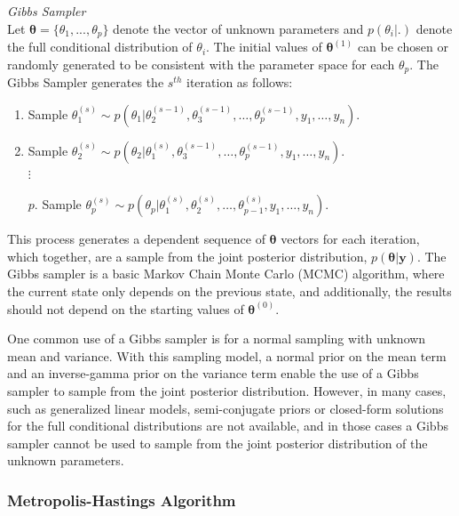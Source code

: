 \documentclass[12pt]{article}\usepackage[]{graphicx}\usepackage[]{color}
\begin{document}
\begin{mdframed}
\textit{Gibbs Sampler} \\
Let $\bm{\theta} = \{\theta_1, ..., \theta_p\}$ denote the vector of unknown parameters and $p(\theta_i|.)$ denote the full conditional distribution of $\theta_i$. The initial values of $\bm{\theta}^{(1)}$ can be chosen or randomly generated to be consistent with the parameter space for each $\theta_p$. The Gibbs Sampler generates the $s^{th}$ iteration as follows:
\begin{enumerate}
\item Sample $\theta_1^{(s)} \sim p(\theta_1|\theta_2^{(s-1)}, \theta_3^{(s-1)}, \dots, \theta_p^{(s-1)}, y_1, \dots, y_n)$. 
\item Sample $\theta_2^{(s)} \sim p(\theta_2|\theta_1^{(s)}, \theta_3^{(s-1)}, \dots, \theta_p^{(s-1)}, y_1, \dots, y_n)$.\\	
$\vdots$ \\[-14mm]
\item[$p$.] Sample $\theta_p^{(s)} \sim p(\theta_p|\theta_1^{(s)}, \theta_2^{(s)}, \dots, \theta_{p-1}^{(s)}, y_1, \dots , y_n)$. 
\end{enumerate}
\end{mdframed}

\noindent This process generates a dependent sequence of $\bm{\theta}$ vectors for each iteration, which together, are a sample from the joint posterior distribution, $p(\bm{\theta}|\bm{y})$. The Gibbs sampler is a basic Markov Chain Monte Carlo (MCMC) algorithm, where the current state only depends on the previous state, and additionally, the results should not depend on the starting values of $\bm{\theta}^{(0)}$.

One common use of a Gibbs sampler is for a normal sampling with unknown mean and variance. With this sampling model, a normal prior on the mean term and an inverse-gamma prior on the variance term enable the use of a Gibbs sampler to sample from the joint posterior distribution. However, in many cases, such as generalized linear models, semi-conjugate priors or closed-form solutions for the full conditional distributions are not available, and in those cases a Gibbs sampler cannot be used to sample from the joint posterior distribution of the unknown parameters. 

\subsubsection{Metropolis-Hastings Algorithm}
\end{document}
